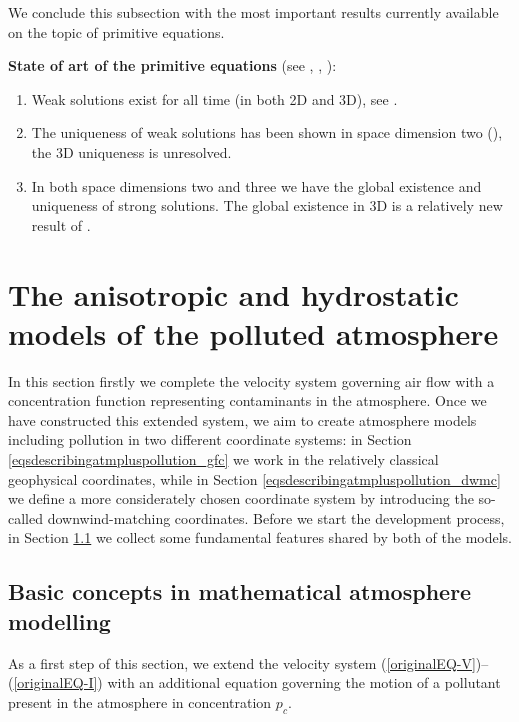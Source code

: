 \documentclass[12pt]{report}
\numberwithin{theorem}{chapter}
\numberwithin{corollary}{chapter}
\numberwithin{lemma}{chapter}
\numberwithin{remark}{chapter}
\numberwithin{definition}{chapter}
\numberwithin{prop}{chapter}
\begin{document}
We conclude this subsection with the most important results currently available on the topic of primitive equations.

\bigskip

\textbf{State of art of the primitive equations} (see \cite{cao2007global}, \cite{li2019primitive}, \cite{temam2005some}):
\begin{enumerate}[label=\arabic*)]
  \item Weak solutions exist for all time (in both 2D and 3D), see \cite{temam2005some}.
  \item The uniqueness of weak solutions has been shown in space dimension two (\cite{temam2005some}), the 3D uniqueness is unresolved.
  \item In both space dimensions two and three we have the global existence and uniqueness of strong solutions. The global existence in 3D is a relatively new result of \cite{cao2007global}.
\end{enumerate}

\section{The anisotropic and hydrostatic models of the polluted atmosphere}\label{anis-hydr-connection}

In this section firstly we complete the velocity system governing air flow with a concentration function representing contaminants in the atmosphere. Once we have constructed this extended system, we aim to create atmosphere models including pollution in two different coordinate systems: in Section \ref{eqsdescribingatmpluspollution_gfc} we work in the relatively classical geophysical coordinates, while in Section \ref{eqsdescribingatmpluspollution_dwmc} we define a more considerately chosen coordinate system by introducing the so-called downwind-matching coordinates. Before we start the development process, in Section \ref{modellingfoundations} we collect some fundamental features shared by both of the models.

\subsection{Basic concepts in mathematical atmosphere modelling}\label{modellingfoundations}

As a first step of this section, we extend the velocity system (\ref{originalEQ-V})--(\ref{originalEQ-I}) with an additional equation governing the motion of a pollutant present in the atmosphere in concentration $p_c.$
\end{document}
